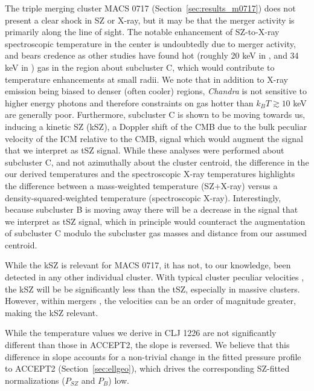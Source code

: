 \documentclass[iop,numberedappendix,apj]{emulateapj}
\begin{document}
The triple merging cluster MACS 0717 (Section~\ref{sec:results_m0717}) does not present a clear shock 
in SZ or X-ray, but it may be that the merger activity is primarily along the line of sight. The notable enhancement of 
SZ-to-X-ray spectroscopic temperature in the center is undoubtedly due to merger activity, and bears credence as
other studies have found hot (roughly 20 keV in \citet{sayers2013,adam2016b}, and 34 keV in \citet{mroczkowski2012}) gas
in the region about subcluster C, which would contribute to temperature enhancements at small radii.
We note that in addition to X-ray emission being biased to denser (often cooler) regions, \emph{Chandra} is not sensitive
to higher energy photons and therefore constraints on gas hotter than
$k_B T \gtrsim 10$ keV are generally poor.
Furthermore, subcluster C is shown to be moving towards us, inducing a kinetic SZ (kSZ), a Doppler shift of the CMB due to the
bulk peculiar velocity of the ICM relative to the CMB, signal which would augment
the signal that we interpret as tSZ signal. While these analyses were performed about subcluster C, and not azimuthally 
about the cluster centroid, the difference in the our derived temperatures and the spectroscopic X-ray temperatures 
highlights the difference between a mass-weighted temperature (SZ+X-ray) versus a density-squared-weighted temperature 
(spectroscopic X-ray). Interestingly, because subcluster B is moving away there will be a decrease in the signal that we 
interpret as tSZ signal, which in principle would counteract the augmentation of subcluster C modulo the subcluster gas 
masses and distance from our assumed centroid. 

While the kSZ is relevant for MACS 0717, it has not, to our knowledge, been detected in any other individual cluster.
With typical cluster peculiar velocities \citep{hernandez2010}, the kSZ will be be significantly less than the tSZ,
especially in massive clusters. However, within mergers \citep[e.g.][]{sarazin2002}, the velocities can be an order of
magnitude greater, making the kSZ relevant.


While the temperature values we derive in CLJ 1226 are not significantly different than those in ACCEPT2, the slope is
reversed. We believe that this difference in slope accounts for a non-trivial change in the fitted pressure profile to
ACCEPT2 (Section~\ref{sec:ellgeo}), which drives the corresponding SZ-fitted normalizations ($P_{SZ}$ and $P_B$) low.
\end{document}
